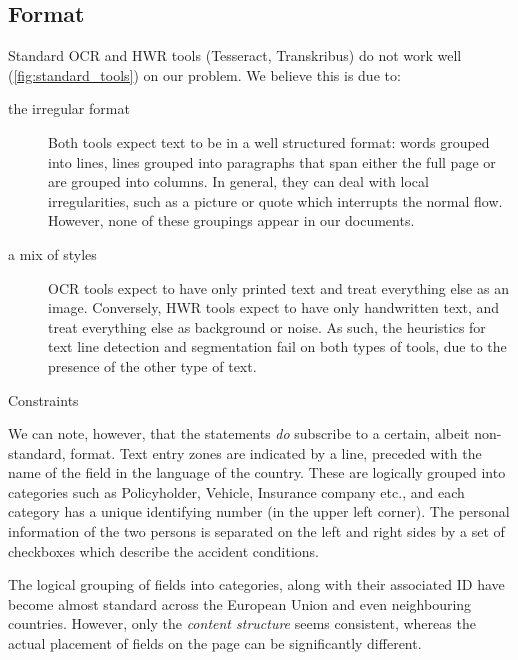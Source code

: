 \subsection{Format}
	Standard OCR and HWR tools (Tesseract, Transkribus) do not work well (\autoref{fig:standard_tools}) on our problem. We believe this is due to:

	\begin{description}
		\item[the irregular format] Both tools expect text to be in a well structured format: words grouped into lines, lines grouped into paragraphs that span either the full page or are grouped into columns. In general, they can deal with local irregularities, such as a picture or quote which interrupts the normal flow. However, none of these groupings appear in our documents.

		\item[a mix of styles] OCR tools expect to have only printed text and treat everything else as an image. Conversely, HWR tools expect to have only handwritten text, and treat everything else as background or noise. As such, the heuristics for text line detection and segmentation fail on both types of tools, due to the presence of the other type of text.

		\item[Constraints] 
	\end{description}

	We can note, however, that the statements \emph{do} subscribe to a certain, albeit non-standard, format. Text entry zones are indicated by a line, preceded with the name of the field in the language of the country. These are logically grouped into categories such as Policyholder, Vehicle, Insurance company etc., and each category has a unique identifying number (in the upper left corner). The personal information of the two persons is separated on the left and right sides by a set of checkboxes which describe the accident conditions.

	The logical grouping of fields into categories, along with their associated ID have become almost standard across the European Union and even neighbouring countries. However, only the \emph{content structure} seems consistent, whereas the actual placement of fields on the page can be significantly different.


